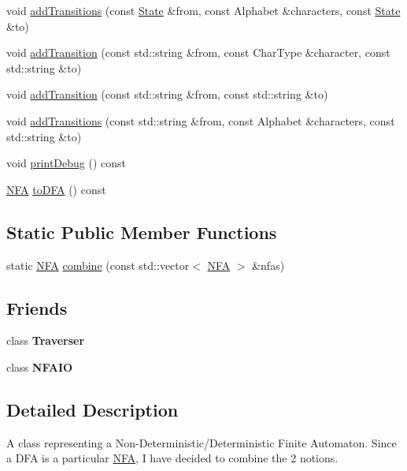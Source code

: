 \begin{DoxyCompactItemize}
\item 
void \hyperlink{classNFA_a84585fb96d8fbd4fa978f22389e22f12}{add\+Transitions} (const \hyperlink{structState}{State} \&from, const Alphabet \&characters, const \hyperlink{structState}{State} \&to)
\item 
void \hyperlink{classNFA_a42e23c1d2b811f41410e77c3e3f1f97c}{add\+Transition} (const std\+::string \&from, const Char\+Type \&character, const std\+::string \&to)
\item 
void \hyperlink{classNFA_abac152eeed3df6612b6a7ce30d3dc796}{add\+Transition} (const std\+::string \&from, const std\+::string \&to)
\item 
void \hyperlink{classNFA_ae81e75d4f68ca63090bf6eeb49f3f833}{add\+Transitions} (const std\+::string \&from, const Alphabet \&characters, const std\+::string \&to)
\item 
void \hyperlink{classNFA_a53ad6f0fa9646d8ffab9427677833164}{print\+Debug} () const 
\item 
\hyperlink{classNFA}{N\+FA} \hyperlink{classNFA_ac6fde2f66abcaf39119e5e4ac86056eb}{to\+D\+FA} () const 
\end{DoxyCompactItemize}
\subsection*{Static Public Member Functions}
\begin{DoxyCompactItemize}
\item 
static \hyperlink{classNFA}{N\+FA} \hyperlink{classNFA_a4ac23a73cb85dbff43bbcf2873dd4f9b}{combine} (const std\+::vector$<$ \hyperlink{classNFA}{N\+FA} $>$ \&nfas)
\end{DoxyCompactItemize}
\subsection*{Friends}
\begin{DoxyCompactItemize}
\item 
class {\bfseries Traverser}\hypertarget{classNFA_a4ed369a6ee2b54f1b68897a0e9c859a2}{}\label{classNFA_a4ed369a6ee2b54f1b68897a0e9c859a2}

\item 
class {\bfseries N\+F\+A\+IO}\hypertarget{classNFA_a63eedf3dea9b1923c2f1d7e49bd0593b}{}\label{classNFA_a63eedf3dea9b1923c2f1d7e49bd0593b}

\end{DoxyCompactItemize}


\subsection{Detailed Description}
A class representing a Non-\/\+Deterministic/\+Deterministic Finite Automaton. Since a D\+FA is a particular \hyperlink{classNFA}{N\+FA}, I have decided to combine the 2 notions. 

